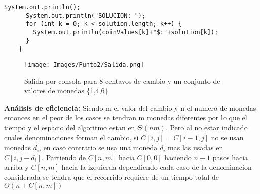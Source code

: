 \begin{lstlisting}[style=java,caption= Problema del cambio]
      System.out.println();
      System.out.println("SOLUCION: ");
      for (int k = 0; k < solution.length; k++) {
        System.out.println(coinValues[k]+"$:"+solution[k]);
      }
    }
\end{lstlisting}

\begin{figure}[!htb]
  \centering
  \texttt{[image: Images/Punto2/Salida.png]}
  \caption{Salida por consola para 8 centavos de cambio y un conjunto de valores de monedas \{1,4,6\}}
\end{figure}

\textbf{Análisis de eficiencia: }Siendo m el valor del cambio y n el numero de monedas entonces en el peor de los casos se tendran m monedas diferentes por lo que el tiempo y el espacio del algoritmo estan en $\Theta(nm)$. Pero al no estar indicado cuales denominaciones forman el cambio, si $C[i,j]=C[i-1,j]$ no se usan monedas $d_i$, en caso contrario se usa una moneda $d_i$ mas las usadas en $C[i,j-d_i]$. Partiendo de $C[n,m]$ hacia $C[0,0]$ haciendo $n-1$ pasos hacia arriba y $C[n,m]$ hacia la izquierda dependiendo cada caso de la denominacion considerada se tendra que el recorrido requiere de un tiempo total de $\Theta(n+C[n,m])$
